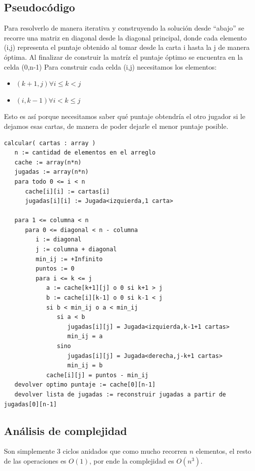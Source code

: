 \subsection{Pseudoc\'odigo}
Para resolverlo de manera iterativa y construyendo la solución desde ``abajo'' se recorre una matriz
en diagonal desde la diagonal principal, donde cada elemento (i,j) representa el puntaje obtenido
al tomar desde la carta i hasta la j de manera óptima. Al finalizar de construir la matríz el puntaje
óptimo se encuentra en la celda (0,n-1)
Para construir cada celda (i,j) necesitamos los elementos:

\begin{itemize}
   \item $(k+1,j) \forall i \le k < j$
   \item $(i,k-1) \forall i < k \le j$
\end{itemize}

Esto es así porque necesitamos saber qué puntaje obtendría el otro jugador si le dejamos esas cartas,
de manera de poder dejarle el menor puntaje posible.

\begin{verbatim}
calcular( cartas : array )
   n := cantidad de elementos en el arreglo
   cache := array(n*n)
   jugadas := array(n*n)
   para todo 0 <= i < n
      cache[i][i] := cartas[i]
      jugadas[i][i] := Jugada<izquierda,1 carta>

   para 1 <= columna < n
      para 0 <= diagonal < n - columna
         i := diagonal
         j := columna + diagonal
         min_ij := +Infinito
         puntos := 0
         para i <= k <= j
            a := cache[k+1][j] o 0 si k+1 > j
            b := cache[i][k-1] o 0 si k-1 < j
            si b < min_ij o a < min_ij
               si a < b
                  jugadas[i][j] = Jugada<izquierda,k-1+1 cartas>
                  min_ij = a
               sino
                  jugadas[i][j] = Jugada<derecha,j-k+1 cartas>
                  min_ij = b
            cache[i][j] = puntos - min_ij
   devolver optimo puntaje := cache[0][n-1]
   devolver lista de jugadas := reconstruir jugadas a partir de jugadas[0][n-1]
\end{verbatim}


\subsection{An\'alisis de complejidad}
Son simplemente 3 ciclos anidados que como mucho recorren $n$ elementos, el resto de las operaciones es $O(1)$, por
ende la complejidad es $O(n^3)$.


